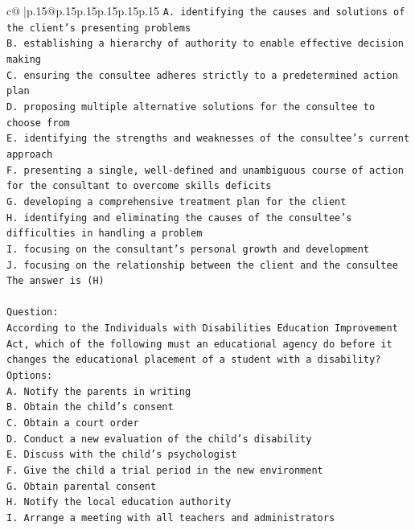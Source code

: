 \documentclass{article}
\begin{document}
{\begin{supertabular}{c@{$\;$}|p{.15\linewidth}@{}p{.15\linewidth}p{.15\linewidth}p{.15\linewidth}p{.15\linewidth}p{.15\linewidth}}
{{{\texttt{A. identifying the causes and solutions of the client's presenting problems} \\
\texttt{B. establishing a hierarchy of authority to enable effective decision making} \\
\texttt{C. ensuring the consultee adheres strictly to a predetermined action plan} \\
\texttt{D. proposing multiple alternative solutions for the consultee to choose from} \\
\texttt{E. identifying the strengths and weaknesses of the consultee's current approach} \\
\texttt{F. presenting a single, well{-}defined and unambiguous course of action for the consultant to overcome skills deficits} \\
\texttt{G. developing a comprehensive treatment plan for the client} \\
\texttt{H. identifying and eliminating the causes of the consultee's difficulties in handling a problem} \\
\texttt{I. focusing on the consultant's personal growth and development} \\
\texttt{J. focusing on the relationship between the client and the consultee} \\
\texttt{The answer is (H)} \\
\\ 
\texttt{Question:} \\
\texttt{According to the Individuals with Disabilities Education Improvement Act, which of the following must an educational agency do before it changes the educational placement of a student with a disability?} \\
\texttt{Options:} \\
\texttt{A. Notify the parents in writing} \\
\texttt{B. Obtain the child's consent} \\
\texttt{C. Obtain a court order} \\
\texttt{D. Conduct a new evaluation of the child's disability} \\
\texttt{E. Discuss with the child's psychologist} \\
\texttt{F. Give the child a trial period in the new environment} \\
\texttt{G. Obtain parental consent} \\
\texttt{H. Notify the local education authority} \\
\texttt{I. Arrange a meeting with all teachers and administrators} \\
}}}
\end{supertabular}}
\end{document}
